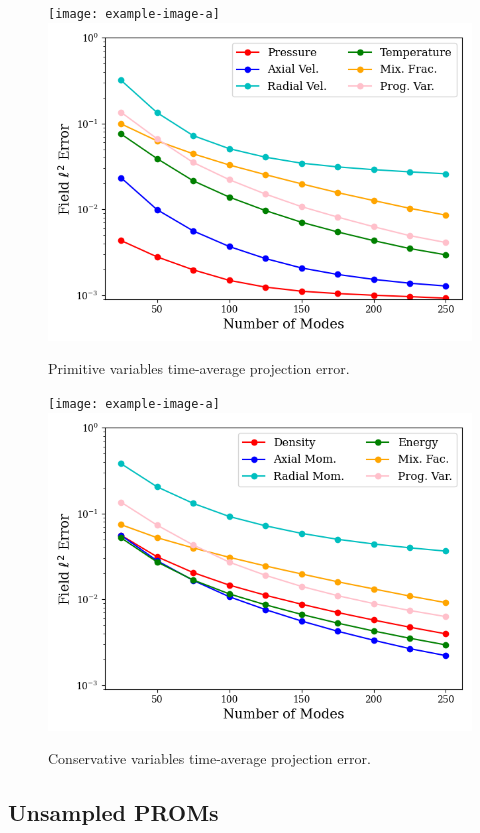 \begin{figure}
	\begin{minipage}{0.48\linewidth}
		\ifdefined\DRAFT
			\texttt{[image: example-image-a]}
		\else
			\includegraphics[width=0.99\linewidth,trim={0.5em 0.5em 0.5em 0.5em},clip]{Chapters/CavityAndCVRC/Images/cvrc/projection_error_primitive.png}
		\fi
		\caption{\label{fig:cvrcProjErrPrim}Primitive variables time-average projection error.}
	\end{minipage} \hspace{0.5em}
	\begin{minipage}{0.48\linewidth}
		\ifdefined\DRAFT
			\texttt{[image: example-image-a]}
		\else
			\includegraphics[width=0.99\linewidth,trim={0.5em 0.5em 0.5em 0.5em},clip]{Chapters/CavityAndCVRC/Images/cvrc/projection_error_conservative.png}
		\fi
		\caption{\label{fig:cvrcProjErrCons}Conservative variables time-average projection error.}
	\end{minipage}
\end{figure}


\subsection{Unsampled PROMs}